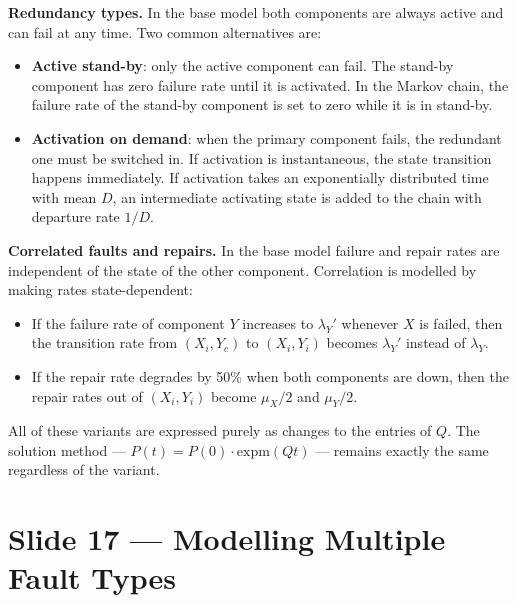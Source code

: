 \textbf{Redundancy types.} In the base model both components are 
always active and can fail at any time. Two common alternatives are:

\begin{itemize}
    \item \textbf{Active stand-by}: only the active component can 
    fail. The stand-by component has zero failure rate until it is 
    activated. In the Markov chain, the failure rate of the stand-by 
    component is set to zero while it is in stand-by.

    \item \textbf{Activation on demand}: when the primary component 
    fails, the redundant one must be switched in. If activation is 
    instantaneous, the state transition happens immediately. If 
    activation takes an exponentially distributed time with mean $D$, 
    an intermediate activating state is added to the chain with 
    departure rate $1/D$.
\end{itemize}

\textbf{Correlated faults and repairs.} In the base model failure 
and repair rates are independent of the state of the other component. 
Correlation is modelled by making rates state-dependent:

\begin{itemize}
    \item If the failure rate of component $Y$ increases to 
    $\lambda_Y'$ whenever $X$ is failed, then the transition rate 
    from $(X_i, Y_c)$ to $(X_i, Y_i)$ becomes $\lambda_Y'$ instead 
    of $\lambda_Y$.

    \item If the repair rate degrades by 50\% when both components 
    are down, then the repair rates out of $(X_i, Y_i)$ become 
    $\mu_X / 2$ and $\mu_Y / 2$.
\end{itemize}

\begin{notebox}
    All of these variants are expressed purely as changes to the 
    entries of $Q$. The solution method --- $P(t) = P(0) \cdot 
    \mathrm{expm}(Qt)$ --- remains exactly the same regardless of 
    the variant.
\end{notebox}

\section*{Slide 17 — Modelling Multiple Fault Types}

